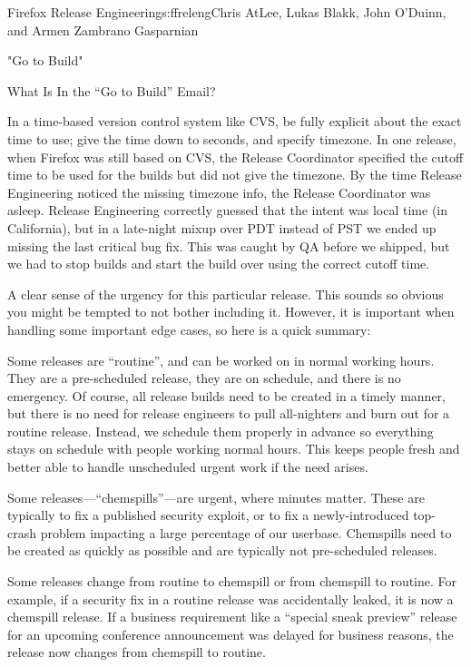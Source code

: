 \begin{aosachapter}{Firefox Release Engineering}{s:ffreleng}{Chris AtLee, Lukas Blakk, John O'Duinn, and Armen Zambrano Gasparnian}
\begin{aosasect1}{"Go to Build"}
\begin{aosasect2}{What Is In the ``Go to Build'' Email?}
\begin{aosaenumerate}
\begin{aosaenumerate2}
    \item In a time-based version control system like CVS, be fully
      explicit about the exact time to use; give the time down to seconds,
      and specify timezone. In one release, when Firefox was still
      based on CVS, the Release Coordinator specified the cutoff time
      to be used for the builds but did not give the timezone. By the
      time Release Engineering noticed the missing timezone info, the
      Release Coordinator was asleep. Release
      Engineering correctly guessed that the intent was local time (in
      California), but in a late-night mixup over PDT instead of PST
      we ended up missing the last critical bug fix. This was caught
      by QA before we shipped, but we had to stop builds and
      start the build over using the correct cutoff time.

    \end{aosaenumerate2}

\item A clear sense of the urgency for this particular release.  This
  sounds so obvious you might be tempted to not bother including
  it. However, it is important when handling some important edge
  cases, so here is a quick summary:

  \begin{aosaenumerate2}

    \item Some releases are ``routine'', and can be worked on in
      normal working hours. They are a pre-scheduled release, they are
      on schedule, and there is no emergency. Of course, all release
      builds need to be created in a timely manner, but there is no
      need for release engineers to pull all-nighters and burn out
      for a routine release.  Instead, we schedule them
      properly in advance so everything stays on schedule with people
      working normal hours. This keeps people fresh and better able to
      handle unscheduled urgent work if the need arises.

    \item Some releases---``chemspills''---are urgent, where minutes matter. These are
      typically to fix a published security exploit, or to fix a
      newly-introduced top-crash problem impacting a large percentage
      of our userbase. Chemspills need to be created as
      quickly as possible and are typically not pre-scheduled
      releases.

    \item Some releases change from routine to chemspill or
      from chemspill to routine. For example, if a security
      fix in a routine release was accidentally leaked, it is now
      a chemspill release. If a business requirement like a
      ``special sneak preview'' release for an upcoming
      conference announcement was delayed for business
      reasons, the release now changes from chemspill to
      routine.


\end{aosaenumerate2}
\end{aosaenumerate}
\end{aosasect2}
\end{aosasect1}
\end{aosachapter}
